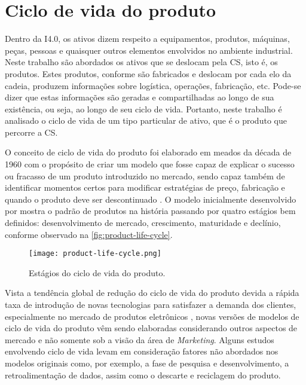 \section{Ciclo de vida do produto}
\label{sec:ciclo-de-vida}

Dentro da I4.0, os ativos dizem respeito a equipamentos, produtos, máquinas, peças, pessoas e quaisquer outros elementos envolvidos no ambiente industrial. Neste trabalho são abordados os ativos que se deslocam pela CS, isto é, os produtos. Estes produtos, conforme são fabricados e deslocam por cada elo da cadeia, produzem informações sobre logística, operações, fabricação, etc. Pode-se dizer que estas informações são geradas e compartilhadas ao longo de sua existência, ou seja, ao longo de seu ciclo de vida. Portanto, neste trabalho é analisado o ciclo de vida de um tipo particular de ativo, que é o produto que percorre a CS.

O conceito de ciclo de vida do produto foi elaborado em meados da década de 1960 com o propósito de criar um modelo que fosse capaz de explicar o sucesso ou fracasso de um produto introduzido no mercado, sendo capaz também de identificar momentos certos para modificar estratégias de preço, fabricação e quando o produto deve ser descontinuado \cite{cao2012lifecycle}. O modelo inicialmente desenvolvido por  mostra o padrão de produtos na história passando por quatro estágios bem definidos: desenvolvimento de mercado, crescimento, maturidade e declínio, conforme observado na \autoref{fig:product-life-cycle}.

\begin{figure}[htb]
	\centering
	\texttt{[image: product-life-cycle.png]}
	\caption{Estágios do ciclo de vida do produto.}
	\label{fig:product-life-cycle}
\end{figure}

Vista a tendência global de redução do ciclo de vida do produto devida a rápida taxa de introdução de novas tecnologias para satisfazer a demanda dos clientes, especialmente no mercado de produtos eletrônicos \cite{trappey2008lifecycle}, novas versões de modelos de ciclo de vida do produto vêm sendo elaboradas considerando outros aspectos de mercado e não somente sob a visão da área de \textit{Marketing}. Alguns estudos \cite{cao2012lifecycle} envolvendo ciclo de vida levam em consideração fatores não abordados nos modelos originais como, por exemplo, a fase de pesquisa e desenvolvimento, a retroalimentação de dados, assim como o descarte e reciclagem do produto.

